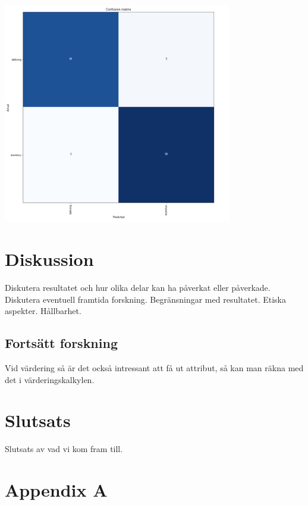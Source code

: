 \documentclass{kththesis}
\begin{document}
\includegraphics[width=10cm]{../images/4.png}

\chapter{Diskussion}
Diskutera resultatet och hur olika delar kan ha påverkat eller påverkade. Diskutera eventuell framtida forskning. Begränsningar med resultatet.
Etiska aspekter. Hållbarhet. 

  \section{Fortsätt forskning}
  Vid värdering så är det också intressant att få ut attribut, så kan man räkna med det i värderingskalkylen.

\chapter{Slutsats}
Slutsats av vad vi kom fram till.

\printbibliography[heading=bibintoc]
\appendix
  \chapter{Appendix A}

\tailmatter
\end{document}
